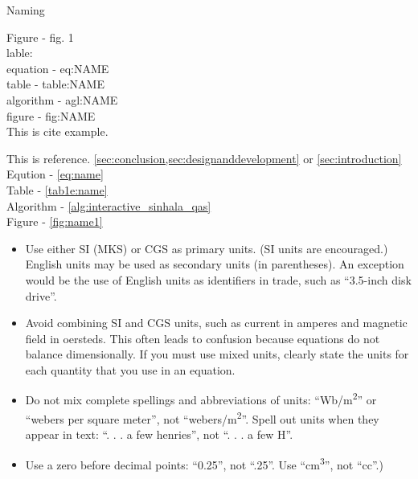 \newpage


\noindent Naming

\noindent  Figure - fig. 1 \\
lable: \\
equation - eq:NAME \\
table - table:NAME \\
algorithm - agl:NAME \\
figure - fig:NAME \\


This is cite example. \cite{IEEEexample:bluebookbook}

This is reference. \cref{sec:conclusion,sec:designanddevelopment} or \ref{sec:introduction}
\newline
Eqution - \cref{eq:name} \\
Table - \cref{tab1e:name} \\
Algorithm - \cref{alg:interactive_sinhala_qas} \\
Figure - \cref{fig:name1} \\
\newline


\begin{itemize}
    \item Use either SI (MKS) or CGS as primary units. (SI units are encouraged.) English units may be used as secondary units (in parentheses). An exception would be the use of English units as identifiers in trade, such as ``3.5-inch disk drive''.
    \item Avoid combining SI and CGS units, such as current in amperes and magnetic field in oersteds. This often leads to confusion because equations do not balance dimensionally. If you must use mixed units, clearly state the units for each quantity that you use in an equation.
    \item Do not mix complete spellings and abbreviations of units: ``Wb/m\textsuperscript{2}'' or ``webers per square meter'', not ``webers/m\textsuperscript{2}''. Spell out units when they appear in text: ``. . . a few henries'', not ``. . . a few H''.
    \item Use a zero before decimal points: ``0.25'', not ``.25''. Use ``cm\textsuperscript{3}'', not ``cc''.)
\end{itemize}

